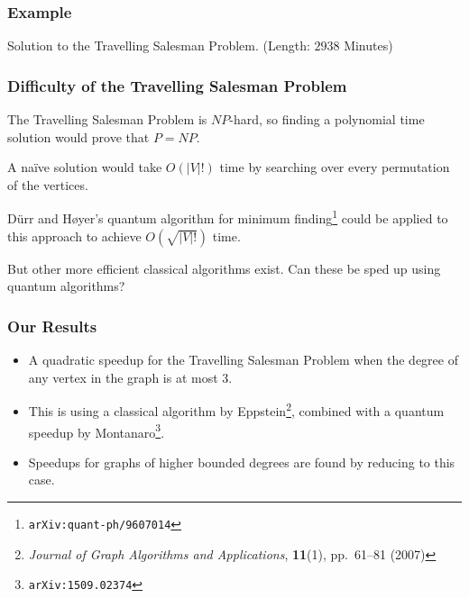 \documentclass[]{beamer}
\begin{document}
\begin{frame}
\frametitle{Example}
\begin{center}

 Solution to the Travelling Salesman Problem. (Length: $2938$ Minutes)
\end{center}
\end{frame}

\begin{frame}
\frametitle{Difficulty of the Travelling Salesman Problem}
The Travelling Salesman Problem is $NP$-hard, so finding a polynomial time solution would prove that $P = NP$.

A na\"ive solution would take $O(|V|!)$ time by searching over every permutation of the vertices.

D\"urr and H\o yer's quantum algorithm for minimum finding\footnote{{\tt arXiv:quant-ph/9607014}} could be applied to this approach to achieve $O(\sqrt{|V|!})$ time.

But other more efficient classical algorithms exist. Can these be sped up using quantum algorithms?
\end{frame}

\begin{frame}
\frametitle{Our Results}
\begin{itemize}
\item A quadratic speedup for the Travelling Salesman Problem when the degree of any vertex in the graph is at most $3$.
\item This is using a classical algorithm by Eppstein\footnote{{\em Journal of Graph Algorithms and Applications}, {\bf 11}(1), pp.\ 61--81 (2007)}, combined with a quantum speedup by Montanaro\footnote{{\tt arXiv:1509.02374}}.
\item Speedups for graphs of higher bounded degrees are found by reducing to this case.
\end{itemize}
\end{frame}
\end{document}

